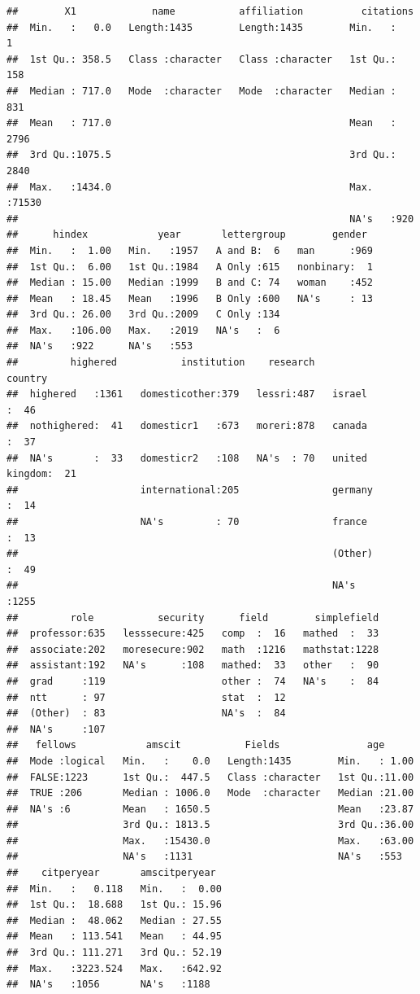 \documentclass[]{article}
\begin{document}
\begin{verbatim}
##        X1             name           affiliation          citations    
##  Min.   :   0.0   Length:1435        Length:1435        Min.   :    1  
##  1st Qu.: 358.5   Class :character   Class :character   1st Qu.:  158  
##  Median : 717.0   Mode  :character   Mode  :character   Median :  831  
##  Mean   : 717.0                                         Mean   : 2796  
##  3rd Qu.:1075.5                                         3rd Qu.: 2840  
##  Max.   :1434.0                                         Max.   :71530  
##                                                         NA's   :920    
##      hindex            year       lettergroup        gender   
##  Min.   :  1.00   Min.   :1957   A and B:  6   man      :969  
##  1st Qu.:  6.00   1st Qu.:1984   A Only :615   nonbinary:  1  
##  Median : 15.00   Median :1999   B and C: 74   woman    :452  
##  Mean   : 18.45   Mean   :1996   B Only :600   NA's     : 13  
##  3rd Qu.: 26.00   3rd Qu.:2009   C Only :134                  
##  Max.   :106.00   Max.   :2019   NA's   :  6                  
##  NA's   :922      NA's   :553                                 
##         highered           institution    research             country    
##  highered   :1361   domesticother:379   lessri:487   israel        :  46  
##  nothighered:  41   domesticr1   :673   moreri:878   canada        :  37  
##  NA's       :  33   domesticr2   :108   NA's  : 70   united kingdom:  21  
##                     international:205                germany       :  14  
##                     NA's         : 70                france        :  13  
##                                                      (Other)       :  49  
##                                                      NA's          :1255  
##         role           security      field        simplefield  
##  professor:635   lesssecure:425   comp  :  16   mathed  :  33  
##  associate:202   moresecure:902   math  :1216   mathstat:1228  
##  assistant:192   NA's      :108   mathed:  33   other   :  90  
##  grad     :119                    other :  74   NA's    :  84  
##  ntt      : 97                    stat  :  12                  
##  (Other)  : 83                    NA's  :  84                  
##  NA's     :107                                                 
##   fellows            amscit           Fields               age       
##  Mode :logical   Min.   :    0.0   Length:1435        Min.   : 1.00  
##  FALSE:1223      1st Qu.:  447.5   Class :character   1st Qu.:11.00  
##  TRUE :206       Median : 1006.0   Mode  :character   Median :21.00  
##  NA's :6         Mean   : 1650.5                      Mean   :23.87  
##                  3rd Qu.: 1813.5                      3rd Qu.:36.00  
##                  Max.   :15430.0                      Max.   :63.00  
##                  NA's   :1131                         NA's   :553    
##    citperyear       amscitperyear   
##  Min.   :   0.118   Min.   :  0.00  
##  1st Qu.:  18.688   1st Qu.: 15.96  
##  Median :  48.062   Median : 27.55  
##  Mean   : 113.541   Mean   : 44.95  
##  3rd Qu.: 111.271   3rd Qu.: 52.19  
##  Max.   :3223.524   Max.   :642.92  
##  NA's   :1056       NA's   :1188
\end{verbatim}
\end{document}
